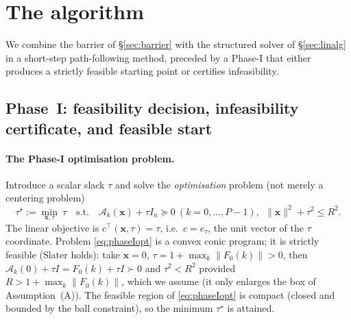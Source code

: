 \documentclass{amsart}
\begin{document}
\section{The algorithm}\label{sec:algo}

We combine the barrier of \S\ref{sec:barrier} with the structured solver of
\S\ref{sec:linalg} in a short-step path-following method, preceded by a Phase-I that
either produces a strictly feasible starting point or certifies infeasibility.

\subsection{Phase~I: feasibility decision, infeasibility certificate, and feasible start}\label{sec:phaseI}

\paragraph{The Phase-I optimisation problem.}
Introduce a scalar slack $\tau$ and solve the \emph{optimisation} problem (not merely
a centering problem)
\begin{equation}\label{eq:phaseIopt}
  \tau^\star:=\min_{\bm x,\tau}\ \tau
  \quad\text{s.t.}\quad
  \mathcal A_k(\bm x)+\tau I_n\succeq0\ (k=0,\dots,P-1),\ \ \|\bm x\|^2+\tau^2\le R^2 .
\end{equation}
The linear objective is $c^{\!\top}(\bm x,\tau)=\tau$, i.e.\ $c=e_\tau$, the unit
vector of the $\tau$ coordinate. Problem \eqref{eq:phaseIopt} is a convex conic
program; it is strictly feasible (Slater holds): take $\bm x=0$,
$\tau=1+\max_k\|F_0(k)\|>0$, then $\mathcal A_k(0)+\tau I=F_0(k)+\tau I\succ0$ and
$\tau^2<R^2$ provided $R>1+\max_k\|F_0(k)\|$, which we assume (it only enlarges the
box of Assumption~(A)). The feasible region of \eqref{eq:phaseIopt} is compact
(closed and bounded by the ball constraint), so the minimum $\tau^\star$ is attained.
\end{document}
